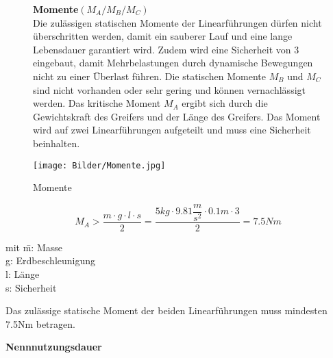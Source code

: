 \documentclass{scrartcl}
\begin{document}
\begin{itemize}








 
\begin{figure}[htbp]
	\hspace{10mm}
	\begin{minipage}[c]{0.5\textwidth} 
	
	
\item \textbf{Momente$(M_A/M_B/M_C)$}	\\
\newline
Die zulässigen statischen Momente der Linearführungen dürfen nicht überschritten werden, damit ein sauberer Lauf und eine lange Lebensdauer garantiert wird. Zudem wird eine Sicherheit von 3 eingebaut, damit Mehrbelastungen durch
dynamische Bewegungen nicht zu einer Überlast führen. Die statischen Momente $M_B$ und $M_C$ sind nicht vorhanden oder sehr gering und können vernachlässigt werden. Das kritische Moment $M_A$ ergibt sich durch die Gewichtskraft des Greifers und der Länge des Greifers. Das Moment wird auf zwei Linearführungen aufgeteilt und muss eine Sicherheit beinhalten.
	\end{minipage}
	\hfill
	\begin{minipage}[c]{0.4\textwidth}
	\texttt{[image: Bilder/Momente.jpg]}
	\caption{Momente}
	\end{minipage}

\end{figure}


\[M_A>\dfrac{m\cdot g \cdot l \cdot s}{2}=\dfrac{5kg\cdot 9.81\dfrac{m}{s^2}\cdot 0.1m\cdot 3}{2}=7.5Nm\]


\begin{tabbing}
mit \=m: Masse\\
		\>g: Erdbeschleunigung\\
		\>l: Länge\\
		\>s: Sicherheit\\
\end{tabbing}


Das zulässige statische Moment der beiden Linearführungen muss mindesten 7.5Nm betragen.\\



\item \textbf{Nennnutzungsdauer}


\end{itemize}
\end{document}

